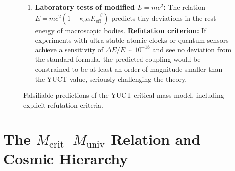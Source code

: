 \documentclass[12pt,a4paper]{article}
\begin{document}
\begin{figure}[!ht]
{\begin{minipage}{0.95\textwidth}
\begin{enumerate}
					hence \(f_{\mathrm{NL}}^{\mathrm{local}} = \frac{5}{3}\beta \approx 1.12\). This is a robust, non‑zero prediction, distinguishable from standard slow‑roll inflation (\(f_{\mathrm{NL}} \ll 1\)). \textbf{Refutation criterion:} If future surveys (Euclid, SPHEREx) measure \(f_{\mathrm{NL}}^{\mathrm{local}} < 0.5\) or \(> 1.8\) at \(>3\sigma\) significance, the theory is falsified.
					\item \textbf{Laboratory tests of modified \(E=mc^2\):} The relation \(E = m c^2 (1 + \kappa_c \alpha K_{\mathrm{eff}}^{-\beta})\) predicts tiny deviations in the rest energy of macroscopic bodies. \textbf{Refutation criterion:} If experiments with ultra‑stable atomic clocks or quantum sensors achieve a sensitivity of \(\Delta E / E \sim 10^{-18}\) and see no deviation from the standard formula, the predicted coupling would be constrained to be at least an order of magnitude smaller than the YUCT value, seriously challenging the theory.
				\end{enumerate}
				\vspace{1em}
		\end{minipage}}
		\caption{Falsifiable predictions of the YUCT critical mass model, including explicit refutation criteria.}
		\label{fig:predictions}
	\end{figure}
	
	\part{The \(M_{\mathrm{crit}}\)–\(M_{\mathrm{univ}}\) Relation and Cosmic Hierarchy}
	\label{part:II}
	
\end{document}
